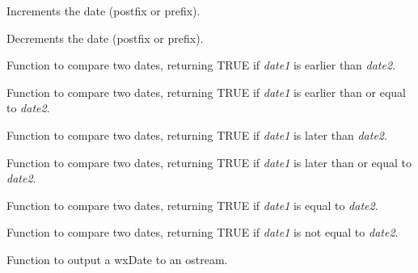 \label{wxdateplusplus}


Increments the date (postfix or prefix).

\label{wxdateminusminus}


Decrements the date (postfix or prefix).

\label{wxdatelessthan}


Function to compare two dates, returning TRUE if {\it date1} is earlier than {\it date2}.

\label{wxdatelessthaneq}


Function to compare two dates, returning TRUE if {\it date1} is earlier than or equal to {\it date2}.

\label{wxdategreaterthan}


Function to compare two dates, returning TRUE if {\it date1} is later than {\it date2}.

\label{wxdategreaterthaneq}


Function to compare two dates, returning TRUE if {\it date1} is later than or equal to {\it date2}.

\label{wxdateequals}


Function to compare two dates, returning TRUE if {\it date1} is equal to {\it date2}.

\label{wxdatenotequals}


Function to compare two dates, returning TRUE if {\it date1} is not equal to {\it date2}.

\label{wxdateinsert}


Function to output a wxDate to an ostream.


